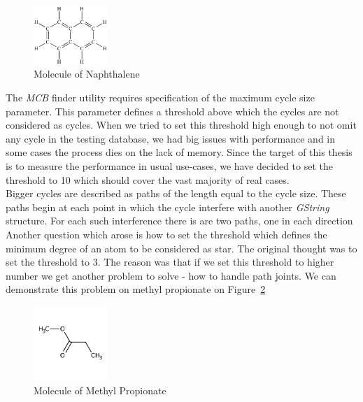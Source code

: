 {\begin{figure}[h]
	\centering
	\includegraphics[width=0.25\textwidth]{../img/naphthalene01.png}
	\caption{Molecule of Naphthalene}
	\label{fig:naphthalene}
\end{figure}

The \textit{MCB} finder utility requires specification of the maximum cycle size parameter. This parameter defines a threshold above which the cycles are not considered as cycles. When we tried to set this threshold high enough to not omit any cycle in the testing database, we had big issues with performance and in some cases the process dies on the lack of memory. Since the target of this thesis is to measure the performance in usual use-cases, we have decided to set the threshold to 10 which should cover the vast majority of real cases.\\

Bigger cycles are described as paths of the length equal to the cycle size. These paths begin at each point in which the cycle interfere with another \textit{GString} structure. For each such interference there is are two paths, one in each direction\\

Another question which arose is how to set the threshold which defines the minimum degree of an atom to be considered as star. The original thought was to set the threshold to 3. The reason was that if we set this threshold to higher number we get another problem to solve - how to handle path joints. We can demonstrate this problem on methyl propionate on Figure~\ref{fig:methyl-propionate}\\

\begin{figure}[h]
	\centering
	\includegraphics[width=0.25\textwidth]{../img/methyl-propionate.jpg}
	\caption{Molecule of Methyl Propionate}
	\label{fig:methyl-propionate}
\end{figure}

}

